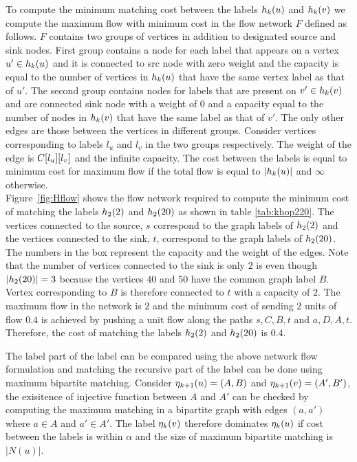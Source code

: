  To compute the minimum
matching cost between the \khop labels
$h_{k}(u)$ and $h_{k}(v)$ we compute the maximum flow with minimum
cost in the flow network $F$ defined as follows. $F$ contains two groups of
vertices in addition to designated source and sink nodes. 
First group contains a node for
each label that appears on a vertex $u' \in h_{k}(u)$ and it is connected
to src node with zero weight and the capacity is equal to the number of vertices
in $h_{k}(u)$ that have the same vertex label as that of $u'$.
The second group contains nodes
for labels that are present on $v' \in h_{k}(v)$ and are connected sink 
node with a weight of $0$ and a capacity equal to the 
number of nodes in $h_{k}(v)$ that have the same label as
that of $v'$. The only other edges are those between the
vertices in different groups. Consider vertices corresponding to labels $l_u$
and $l_v$ in the two groups respectively. The weight of the edge is ${C}[l_u][l_v]$
and the infinite capacity.
The cost between the \khop labels is equal to
minimum cost for maximum flow if the total flow is equal to $|h_{k}(u)|$ and 
$\infty$ otherwise. \\
Figure~\ref{fig:Hflow} shows the flow network required to compute the minimum
cost of matching the \khop labels $h_{2}(2)$ and $h_{2}(20)$ as shown in
table \ref{tab:khop220}. The vertices connected to the source, $s$ correspond to
the graph labels of $h_{2}(2)$ and the vertices connected to the sink, $t$, 
correspond to the graph labels of $h_{2}(20)$. The numbers in the box represent
the capacity and the weight of the edges.
Note that the number of vertices connected to the sink is only $2$ 
is even though $|h_{2}(20)| = 3$ because the vertices $40$ and $50$
have the common graph label $B$. Vertex corresponding to $B$ is therefore
connected to $t$ with a capacity of $2$. The maximum flow in the network
is $2$ and the minimum cost of sending $2$ units of flow $0.4$ is 
achieved by pushing a unit flow along the paths $s, C, B, t$ and $a, D, A, t$.
Therefore, the cost of matching the labels $h_{2}(2)$ and $h_{2}(20)$
is $0.4$.

 The \khop label part of the \ncl label can
be compared using the above network flow formulation and matching the recursive
part of the \ncl label can be done using maximum bipartite matching. Consider 
$\eta_{k+1}(u) = (A, B)$ and $\eta_{k+1}(v) = (A', B')$, the 
exisitence of injective function between $A$ and $A'$ can be checked by computing 
the maximum matching in a bipartite graph with edges $(a, a')$ where $a \in A$ and
$a' \in A'$.
The \ncl label
$\eta_{k}(v)$ therefore dominates $\eta_{k}(u)$ if cost between the \khop labels is within
$\alpha$ and the size of maximum bipartite matching is $|N(u)|$.

